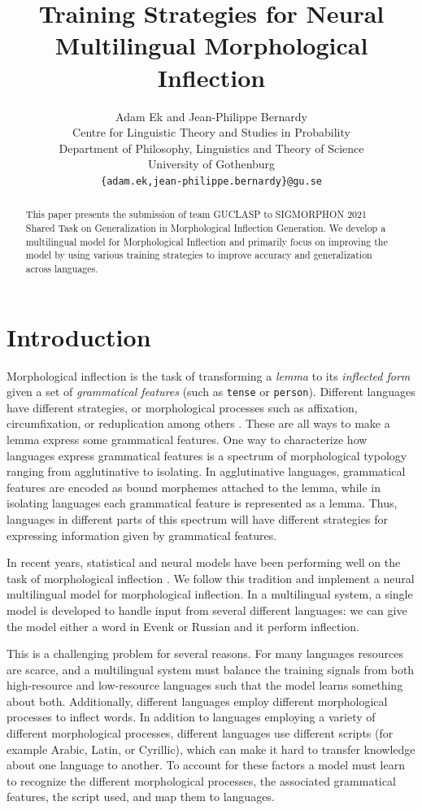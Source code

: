 \documentclass[11pt,a4paper]{article}
\title{Training Strategies for Neural Multilingual Morphological Inflection}
\author{Adam Ek and Jean-Philippe Bernardy \\
	Centre for Linguistic Theory and Studies in Probability \\
	Department of Philosophy, Linguistics and Theory of Science \\
	University of Gothenburg \\
	\texttt{\{adam.ek,jean-philippe.bernardy\}@gu.se} \\}
\date{}
\begin{document}
\maketitle
\begin{abstract}
This paper presents the submission of team GUCLASP to SIGMORPHON 2021
Shared Task on Generalization in Morphological Inflection Generation.
We develop a multilingual model for Morphological Inflection and
primarily focus on improving the model by using various training
strategies to improve accuracy and generalization across languages.
\end{abstract}

\section{Introduction}

Morphological inflection is the task of transforming a \emph{lemma} to
its \emph{inflected form} given a set of \emph{grammatical features}
(such as \texttt{tense} or \texttt{person}).  Different languages have
different strategies, or morphological processes such as affixation,
circumfixation, or reduplication among others
\cite{haspelmath2013understanding}.  These are all ways to make a
lemma express some grammatical features.  One way to characterize
how languages express grammatical features is a spectrum of
morphological typology ranging from agglutinative to isolating. In
agglutinative languages, grammatical features are encoded as bound
morphemes attached to the lemma, while in isolating languages each
grammatical feature is represented as a lemma. Thus, languages in
different parts of this spectrum will have different strategies for
expressing information given by grammatical features.

In recent years, statistical and neural models have been performing
well on the task of morphological inflection
\cite{DBLP:conf/eacl/SmitVGK14, kann2016med,
DBLP:conf/conll/MakarovRC17, sharma-etal-2018-iit}. We follow this
tradition and implement a neural multilingual model for morphological
inflection. In a multilingual system, a single model is developed to
handle input from several different languages:  we can give
the model either a word in Evenk or Russian and it perform inflection.

This is a challenging problem for several reasons. For many languages
resources are scarce, and a multilingual system must balance
the training signals from both high-resource and low-resource
languages such that the model learns something about both.
Additionally, different languages employ different morphological
processes to inflect words. In addition to languages employing a
variety of different morphological processes, different languages use
different scripts (for example Arabic, Latin, or Cyrillic), which can
make it hard to transfer knowledge about one language to another.  To
account for these factors a model must learn to recognize the
different morphological processes, the associated grammatical
features, the script used, and map them to languages.
\end{document}
